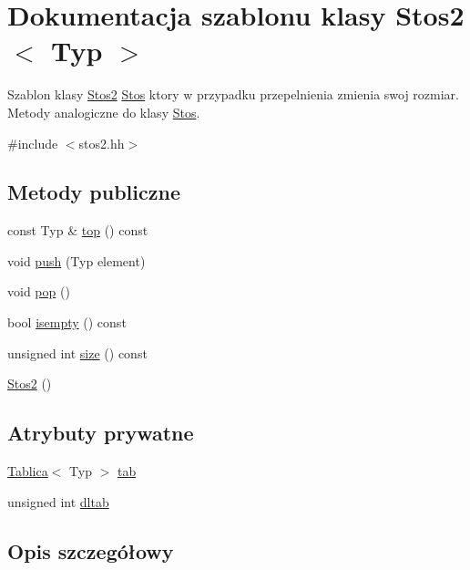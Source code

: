 \hypertarget{class_stos2}{\section{Dokumentacja szablonu klasy Stos2$<$ Typ $>$}
\label{class_stos2}
}


Szablon klasy \hyperlink{class_stos2}{Stos2} \hyperlink{class_stos}{Stos} ktory w przypadku przepelnienia zmienia swoj rozmiar. Metody analogiczne do klasy \hyperlink{class_stos}{Stos}.  




{\ttfamily \#include $<$stos2.\-hh$>$}

\subsection*{Metody publiczne}
\begin{DoxyCompactItemize}
\item 
const Typ \& \hyperlink{class_stos2_a4cefb452cfd2da4eab15b9380c87b219}{top} () const 
\item 
void \hyperlink{class_stos2_ab9bf4dc27877d77a3a53736d33fb965f}{push} (Typ element)
\item 
void \hyperlink{class_stos2_a9695a855dac219cc685cdded92ee38ac}{pop} ()
\item 
bool \hyperlink{class_stos2_a749e533abbbb8db8e5d97e6028869a7a}{isempty} () const 
\item 
unsigned int \hyperlink{class_stos2_a6599f822eabbade13ab6593ebec18182}{size} () const 
\item 
\hyperlink{class_stos2_a91771fcaa090ac82d4e14603624f4dd3}{Stos2} ()
\end{DoxyCompactItemize}
\subsection*{Atrybuty prywatne}
\begin{DoxyCompactItemize}
\item 
\hyperlink{class_tablica}{Tablica}$<$ Typ $>$ \hyperlink{class_stos2_a9c7f4132f7a4302226d62fd816ed10ed}{tab}
\item 
unsigned int \hyperlink{class_stos2_ad485021174de06d5faedba7cad9cbaa2}{dltab}
\end{DoxyCompactItemize}


\subsection{Opis szczegółowy}

